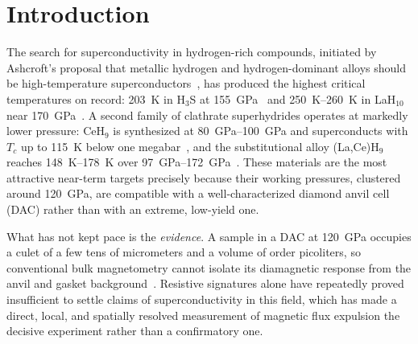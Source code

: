\documentclass[preprint,12pt]{elsarticle}
\begin{document}
\section{Introduction}
\label{sec:intro}

The search for superconductivity in hydrogen-rich compounds, initiated by
Ashcroft's proposal that metallic hydrogen and hydrogen-dominant alloys should be
high-temperature superconductors~\cite{Ashcroft1968,Ashcroft2004}, has produced
the highest critical temperatures on record: \SI{203}{\kelvin} in
H$_3$S at \SI{155}{\giga\pascal}~\cite{Drozdov2015} and \SIrange{250}{260}{\kelvin}
in LaH$_{10}$ near \SI{170}{\giga\pascal}~\cite{Drozdov2019,Somayazulu2019}. A
second family of clathrate superhydrides operates at markedly lower
pressure: CeH$_9$ is synthesized at \SIrange{80}{100}{\giga\pascal} and
superconducts with $T_c$ up to \SI{115}{\kelvin} below one
megabar~\cite{Salke2019,Chen2021CeH9}, and the substitutional alloy
(La,Ce)H$_9$ reaches \SIrange{148}{178}{\kelvin} over
\SIrange{97}{172}{\giga\pascal}~\cite{Semenok2022LaCeH9}. These materials are the
most attractive near-term targets precisely because their working pressures,
clustered around \SI{120}{\giga\pascal}, are compatible with a well-characterized
diamond anvil cell (DAC) rather than with an extreme, low-yield one.

What has not kept pace is the \emph{evidence}. A sample in a DAC at
\SI{120}{\giga\pascal} occupies a culet of a few tens of micrometers and a volume
of order picoliters, so conventional bulk magnetometry cannot isolate its
diamagnetic response from the anvil and gasket background~\cite{Minkov2022}.
Resistive signatures alone have repeatedly proved insufficient to settle claims of
superconductivity in this field, which has made a direct, local, and spatially
resolved measurement of magnetic flux expulsion the decisive experiment rather
than a confirmatory one.
\end{document}
